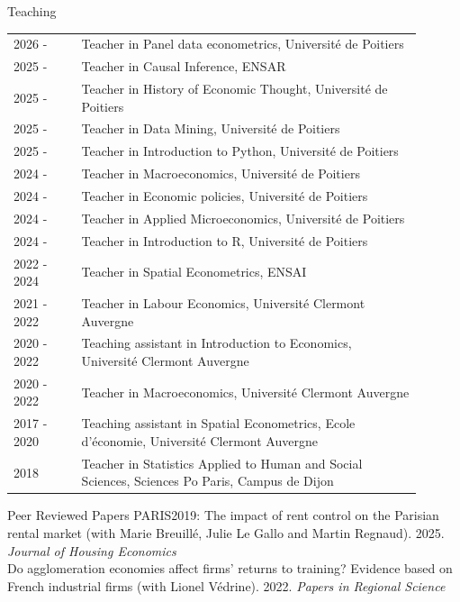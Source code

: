 \documentclass{resume} %
\begin{document}
\begin{rSection}{Teaching}
\begin{table}[H]
{\def\arraystretch{1.5}\tabcolsep=0pt
\begin{tabular}{p{0.15\linewidth}p{0.75\linewidth}}
2026 - & Teacher in Panel data econometrics, Université de Poitiers\\
2025 - & Teacher in Causal Inference, ENSAR\\
2025 - & Teacher in History of Economic Thought, Université de Poitiers \\
2025 - & Teacher in Data Mining, Université de Poitiers \\
2025 - & Teacher in Introduction to Python, Université de Poitiers \\
2024 - & Teacher in Macroeconomics, Université de Poitiers \\
2024 - & Teacher in Economic policies, Université de Poitiers \\
2024 - & Teacher in Applied Microeconomics, Université de Poitiers \\
2024 - & Teacher in Introduction to R, Université de Poitiers \\
2022 - 2024 &  Teacher in Spatial Econometrics, ENSAI \\
2021 - 2022 & Teacher in Labour Economics, Université Clermont Auvergne\\
2020 - 2022 & Teaching assistant in Introduction to Economics, Université Clermont Auvergne\\
2020 - 2022 & Teacher in Macroeconomics, Université Clermont Auvergne\\
2017 - 2020 &  Teaching assistant in Spatial Econometrics, Ecole d'économie, Université Clermont Auvergne\\
2018 &  Teacher in Statistics Applied to Human and Social Sciences, Sciences Po Paris, Campus de Dijon\\
\end{tabular}%
}
\end{table}
\end{rSection}
\begin{rSection}{Peer Reviewed Papers}
\vspace*{4mm}
PARIS2019: The impact of rent control on the Parisian rental market (with Marie Breuillé, Julie Le Gallo and Martin Regnaud). 2025. \textit{Journal of Housing Economics}\\

Do agglomeration economies affect firms’ returns to training? Evidence based on French industrial firms (with Lionel Védrine). 2022. \textit{Papers in Regional Science}
\end{rSection}
\end{document}

